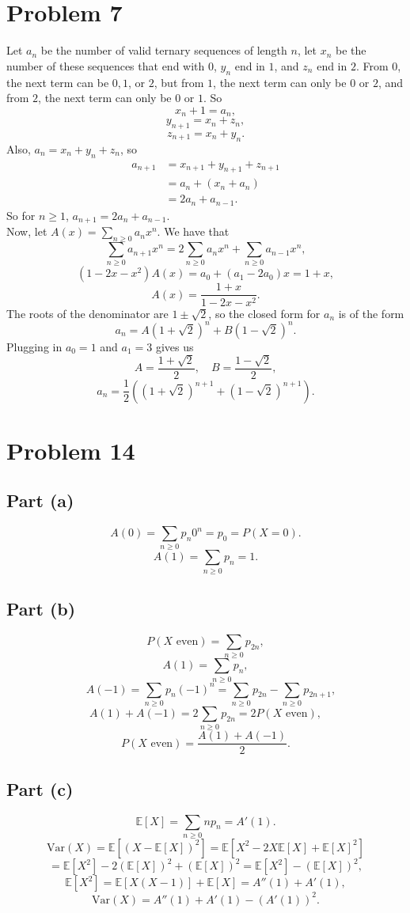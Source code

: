 \documentclass{article}
\begin{document}
\section*{Problem 7}
Let $a_n$ be the number of valid ternary sequences of length $n$, let $x_n$ be the number of these sequences that end with $0$, $y_n$ end in $1$, and $z_n$ end in $2$. From $0$, the next term can be $0, 1$, or $2$, but from $1$, the next term can only be $0$ or $2$, and from $2$, the next term can only be $0$ or $1$. So
$$x_n + 1 = a_n,$$
$$y_{n + 1} = x_n + z_n,$$
$$z_{n + 1} = x_n + y_n.$$
Also, $a_n = x_n + y_n + z_n$, so 
\begin{align*}
    a_{n + 1} &= x_{n + 1} + y_{n + 1} + z_{n + 1} \\
    &= a_n + (x_n + a_n) \\
    &= 2a_n + a_{n - 1}.
\end{align*}
So for $n \ge 1$, $a_{n + 1} = 2a_n + a_{n - 1}$. \\

Now, let $A(x) = \sum_{n \ge 0} a_nx^n$. We have that
$$\sum_{n \ge 0} a_{n + 1}x^n = 2\sum_{n \ge 0}a_nx^n + \sum_{n \ge 0}a_{n - 1}x^n,$$
$$(1 - 2x - x^2)A(x) = a_0 + (a_1 - 2a_0)x = 1 + x,$$
$$A(x) = \frac{1 + x}{1 - 2x - x^2}.$$
The roots of the denominator are $1 \pm \sqrt{2}$, so the closed form for $a_n$ is of the form
$$a_n = A(1 + \sqrt{2})^n + B(1 - \sqrt{2})^n.$$
Plugging in $a_0 = 1$ and $a_1 = 3$ gives us
$$A = \frac{1 + \sqrt{2}}{2},\quad B = \frac{1 - \sqrt{2}}{2},$$
$$a_n = \frac{1}{2}((1 + \sqrt{2})^{n + 1} + (1 - \sqrt{2})^{n + 1}).$$

\section*{Problem 14}
\subsection*{Part (a)}
$$A(0) = \sum_{n \ge 0}p_n0^n = p_0 = P(X = 0).$$
$$A(1) = \sum_{n \ge 0}p_n = 1.$$

\subsection*{Part (b)}
$$P(X \text{ even}) = \sum_{n \ge 0} p_{2n},$$
$$A(1) = \sum_{n \ge 0}p_n,$$
$$\quad A(-1) = \sum_{n \ge 0}p_n(-1)^n = \sum_{n \ge 0}p_{2n} - \sum_{n \ge 0}p_{2n + 1},$$
$$A(1) + A(-1) = 2\sum_{n \ge 0}p_{2n} = 2P(X \text{ even}),$$
$$P(X \text{ even}) = \frac{A(1) + A(-1)}{2}.$$

\subsection*{Part (c)}
$$\mathbb{E}[X] = \sum_{n \ge 0}np_n = A'(1).$$
$$\text{Var}(X) = \mathbb{E}[(X - \mathbb{E}[X])^2] = \mathbb{E}[X^2 - 2X\mathbb{E}[X] + \mathbb{E}[X]^2]$$
$$= \mathbb{E}[X^2] - 2(\mathbb{E}[X])^2 + (\mathbb{E}[X])^2 = \mathbb{E}[X^2] - (\mathbb{E}[X])^2,$$
$$\mathbb{E}[X^2] = \mathbb{E}[X(X - 1)] + \mathbb{E}[X] = A''(1) + A'(1),$$
$$\text{Var}(X) = A''(1) + A'(1) - (A'(1))^2.$$
\end{document}
